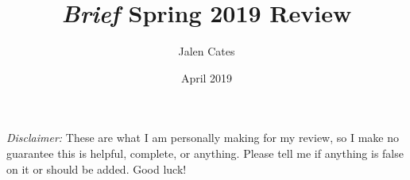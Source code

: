 \documentclass{book}
\title{\emph{Brief} Spring 2019 Review}
\author{Jalen Cates}
\date{April 2019}
\begin{document}
\maketitle

\vspace*{25pt}
\Large{\emph{Disclaimer:} These are what I am personally making for my review, so I make no guarantee this is helpful, complete, or anything. Please tell me if anything is false on it or should be added. Good luck!}
\normalsize


\tableofcontents
















\end{document}
